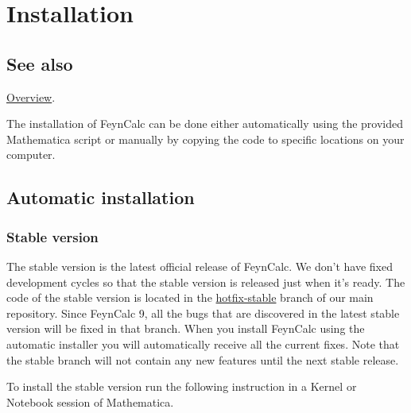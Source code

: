 \documentclass[../FeynCalcManual.tex]{subfiles}
\begin{document}
\hypertarget{installation}{
\section{Installation}\label{installation}}

\subsection{See also}

\hyperlink{toc}{Overview}.

The installation of FeynCalc can be done either automatically using the
provided Mathematica script or manually by copying the code to specific
locations on your computer.

\hypertarget{automatic-installation}{%
\subsection{Automatic installation}\label{automatic-installation}}

\hypertarget{stable-version}{%
\subsubsection{Stable version}\label{stable-version}}

The stable version is the latest official release of FeynCalc. We don't
have fixed development cycles so that the stable version is released
just when it's ready. The code of the stable version is located in the
\href{https://github.com/FeynCalc/feyncalc/tree/hotfix-stable}{hotfix-stable}
branch of our main repository. Since FeynCalc 9, all the bugs that are
discovered in the latest stable version will be fixed in that branch.
When you install FeynCalc using the automatic installer you will
automatically receive all the current fixes. Note that the stable branch
will not contain any new features until the next stable release.

To install the stable version run the following instruction in a Kernel
or Notebook session of Mathematica.

\begin{Shaded}
\begin{Highlighting}[]
\OperatorTok{[}\OperatorTok{]}
\OperatorTok{[]}
\end{Highlighting}
\end{Shaded}
\end{document}
